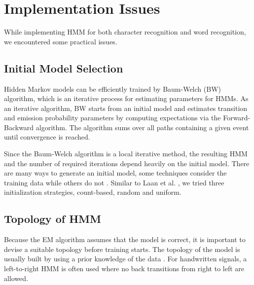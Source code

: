 
\section{Implementation Issues}

While implementing HMM for both character recognition and word recognition, we encountered some practical issues.

\subsection{Initial Model Selection}


Hidden Markov models can be efficiently trained by Baum-Welch (BW) algorithm, which is an iterative process for estimating parameters for HMMs. 
As an iterative algorithm, BW starts from an initial model and estimates transition and emission probability parameters by computing expectations via the Forward-Backward algorithm.
The algorithm sums over all paths containing a given event until convergence is reached.

Since the Baum-Welch algorithm is a local iterative method, the resulting HMM and the number of required iterations depend heavily on the initial model. 
There are many ways to generate an initial model, some techniques consider the training data while others do not \cite{Laan}.
Similar to Laan et al. \cite{Laan}, we tried three initialization strategies,  count-based, random and uniform. %

\subsection{Topology of HMM}

Because the EM algorithm assumes that the model is correct, it is important to devise a suitable topology before training starts. 
The topology of the model is usually built by using a prior knowledge of the data \cite{Suen}. 
For handwritten signals, a left-to-right HMM is often used where no back transitions from right to left are allowed.


